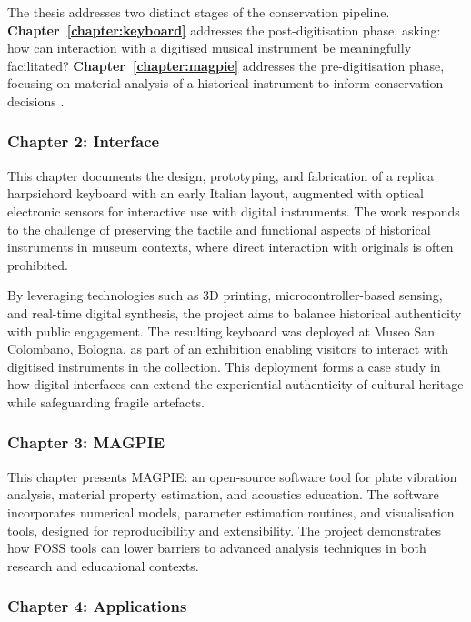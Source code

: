 The thesis addresses two distinct stages of the conservation pipeline. \textbf{Chapter~\ref{chapter:keyboard}} addresses the post-digitisation phase, asking: how can interaction with a digitised musical instrument be meaningfully facilitated? \textbf{Chapter~\ref{chapter:magpie}} addresses the pre-digitisation phase, focusing on material analysis of a historical instrument to inform conservation decisions \cite{barclay_care_1997}.

\subsubsection{Chapter 2: Interface}

This chapter documents the design, prototyping, and fabrication of a replica harpsichord keyboard with an early Italian layout, augmented with optical electronic sensors for interactive use with digital instruments. The work responds to the challenge of preserving the tactile and functional aspects of historical instruments in museum contexts, where direct interaction with originals is often prohibited.

By leveraging technologies such as 3D printing, microcontroller-based sensing, and real-time digital synthesis, the project aims to balance historical authenticity with public engagement. The resulting keyboard was deployed at Museo San Colombano, Bologna, as part of an exhibition enabling visitors to interact with digitised instruments in the collection. This deployment forms a case study in how digital interfaces can extend the experiential authenticity of cultural heritage \cite{trant_when_1999, pine_museums_2007} while safeguarding fragile artefacts.

\subsubsection{Chapter 3: MAGPIE}

This chapter presents MAGPIE: an open-source software tool for plate vibration analysis, material property estimation, and acoustics education. The software incorporates numerical models, parameter estimation routines, and visualisation tools, designed for reproducibility and extensibility. The project demonstrates how FOSS tools can lower barriers to advanced analysis techniques in both research and educational contexts.

\subsubsection{Chapter 4: Applications}

